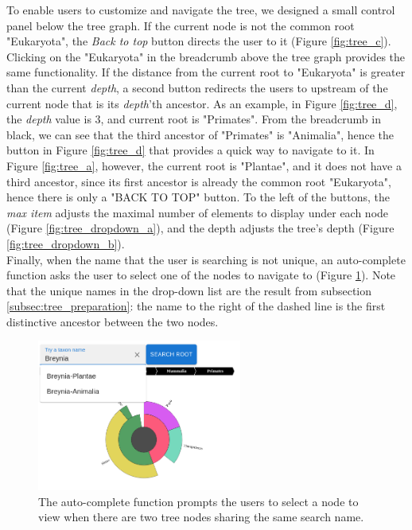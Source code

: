 \documentclass[11pt, a4paper,oneside,chapterprefix=false]{scrbook}
\begin{document}
To enable users to customize and navigate the tree, we designed a small control panel below the tree graph. If the current node is not the common root "Eukaryota", the \emph{Back to top} button directs the user to it (Figure \ref{fig:tree_c}). Clicking on the "Eukaryota" in the breadcrumb above the tree graph provides the same functionality. If the distance from the current root to "Eukaryota" is greater than the current \emph{depth}, a second button redirects the users to upstream of the current node that is its \emph{depth}'th ancestor. As an example, in Figure \ref{fig:tree_d}, the \emph{depth} value is 3, and current root is "Primates". From the breadcrumb in black, we can see that the third ancestor of "Primates" is "Animalia", hence the button in Figure \ref{fig:tree_d} that provides a quick way to navigate to it. In Figure \ref{fig:tree_a}, however, the current root is "Plantae", and it does not have a third ancestor, since its first ancestor is already the common root "Eukaryota", hence there is only a "BACK TO TOP" button. To the left of the buttons, the \emph{max item} adjusts the maximal number of elements to display under each node (Figure \ref{fig:tree_dropdown_a}), and the depth adjusts the tree's depth (Figure \ref{fig:tree_dropdown_b}). \\

Finally, when the name that the user is searching is not unique, an auto-complete function asks the user to select one of the nodes to navigate to (Figure \ref{fig:tree_autocomplete}). Note that the unique names in the drop-down list are the result from subsection \ref{subsec:tree_preparation}: the name to the right of the dashed line is the first distinctive ancestor between the two nodes.

\begin{figure}[h]
	\centering
	\includegraphics[width=0.6\textwidth]{figures/technical_solution/tree/autocomplete}
	\caption{The auto-complete function prompts the users to select a node to view when there are two tree nodes sharing the same search name.  }
	\label{fig:tree_autocomplete}
\end{figure}
 
\end{document}
